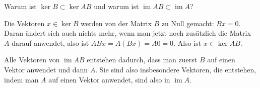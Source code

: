 Warum ist $\operatorname{ker}B \subset \operatorname{ker}AB$ und
warum ist $\operatorname{im}AB\subset\operatorname{im}A$?


\begin{loesung}
Die Vektoren $x\in\operatorname{ker}B$ werden von der Matrix $B$ zu
Null gemacht: $Bx=0$. Daran ändert sich auch nichts mehr, wenn man jetzt
noch zusätzlich die Matrix $A$ darauf anwendet, also ist $ABx=A(Bx)=A0=0$.
Also ist $x\in\operatorname{ker}AB$.

Alle Vektoren von $\operatorname{im}AB$ entstehen dadurch, dass
man zuerst $B$ auf einen Vektor anwendet und dann $A$. Sie sind
also insbesondere Vektoren, die entstehen, indem man $A$ auf einen
Vektor anwendet, sind also in $\operatorname{im}A$.
\end{loesung}

